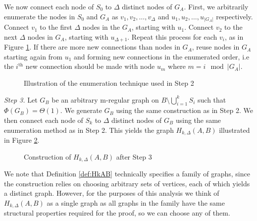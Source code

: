 \begin{definition}
	We now connect each node of $S_0$ to $\Delta$ distinct nodes of $G_A$. First, we arbitrarily enumerate the nodes in $S_0$ and $G_A$ as $v_1, v_2, \dots, v_\Delta$ and $u_1, u_2, \dots, u_{|G_A|}$ respectively. Connect $v_1$ to the first $\Delta$ nodes in the $G_A$, starting with $u_1$. Connect $v_2$ to the next $\Delta$ nodes in $G_A$, starting with $u_{\Delta + 1}$.
	Repeat this process for each $v_i$, as in Figure \ref{fig:HkAB_2}.
	If there are more new connections than nodes in $G_A$, reuse nodes in $G_A$ starting again from $u_1$ and forming new connections in the enumerated order, i.e the $i^\text{th}$ new connection should be made with node $u_m$ where $m = i\mod |G_A|$.

    \begin{figure}[h]
        \centering
        
        \caption{Illustration of the enumeration technique used in Step 2}
        \label{fig:HkAB_2}
    \end{figure}


	\textit{Step 3.} Let $G_B$ be an arbitrary m-regular graph on $B \setminus \bigcup_{i=1}^k S_i$ such that $\Phi(G_B) = \Theta(1)$. 
	We generate $G_B$ using the same construction as in Step 2. We then connect each node of $S_k$ to $\Delta$ distinct nodes of $G_B$ using the same enumeration method as in Step 2. This yields the graph $H_{k, \Delta}(A,B)$ illustrated in Figure \ref{fig:HkAB_3}.

    \begin{figure}[h]
        \centering
        
        \caption{Construction of $H_{k, \Delta}(A,B)$ after Step 3}
        \label{fig:HkAB_3}
    \end{figure}


\end{definition}

We note that Definition \ref{def:HkAB} technically specifies a family of graphs, since the construction relies on choosing arbitrary sets of vertices, each of which yields a distinct graph. However, for the purposes of this analysis we think of $H_{k, \Delta}(A,B)$ as a single graph as all graphs in the family have the same structural properties required for the proof, so we can choose any of them. %

